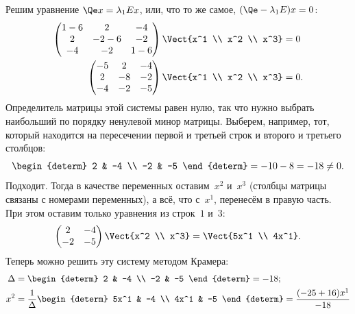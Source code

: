 \begin{solution}
		Решим уравнение $\Qe x = \lambda_1 E x$, или, что то же самое, $(\Qe - \lambda_1 E) x = 0$:
		\begin{align*}
			\begin{pmatrix}
				1 - 6 & 2 & -4 \\
				2 & -2-6 & -2 \\
				-4 & -2 & 1-6
			\end{pmatrix}
			\Vect{x^1 \\ x^2 \\ x^3}
			&=
			0
			\\
			\begin{pmatrix}
				-5 & 2 & -4 \\
				2 & -8 & -2 \\
				-4 & -2 & -5
			\end{pmatrix}
			\Vect{x^1 \\ x^2 \\ x^3}
			&=
			0
			.
		\end{align*}
		Определитель матрицы этой системы равен нулю, так что нужно выбрать наибольший по порядку ненулевой минор матрицы. Выберем, например, тот, который находится на пересечении первой и третьей строк и второго и третьего столбцов:
		\[
			\begin{determ}
				2 & -4 \\
				-2 & -5
			\end{determ}
			=
			-10 - 8 = -18 \neq 0
			.
		\]
		Подходит. Тогда в качестве переменных оставим~$x^2$ и~$x^3$ (столбцы матрицы связаны с номерами переменных), а всё, что с~$x^1$, перенесём в правую часть. При этом оставим только уравнения из строк~$1$ и~$3$:
		\[
			\begin{pmatrix}
				2 & -4 \\
				-2 & -5
			\end{pmatrix}
			\Vect{x^2 \\ x^3}
			=
			\Vect{5x^1 \\ 4x^1}
			.
		\]
		Теперь можно решить эту систему методом Крамера:
		\begin{align*}
			\Delta &= 
			\begin{determ}
				2 & -4 \\
				-2 & -5
			\end{determ}
			=
			-18;
			\\
			x^2 &=
			\frac{1}{\Delta}
			\begin{determ}
				5x^1 & -4 \\
				4x^1 & -5
			\end{determ}
			=
			\frac{(-25+16)x^1}{-18}

\end{align*}
\end{solution}
